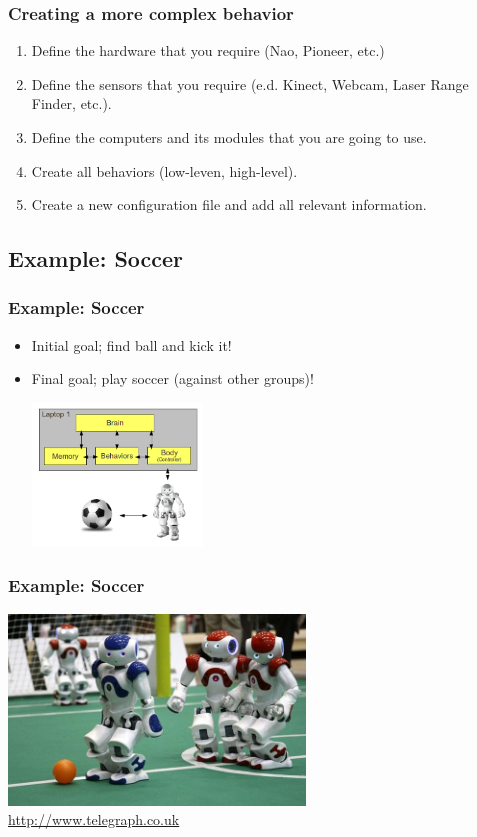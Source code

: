 \documentclass[]{beamer}
\begin{document}
\begin{frame}
    \frametitle{Creating a more complex behavior}
    \begin{enumerate}
        \item Define the hardware that you require (Nao, Pioneer, etc.)
        \item Define the sensors that you require (e.d. Kinect, Webcam, Laser Range Finder, etc.).
        \item Define the computers and its modules that you are going to use.
        \item Create all behaviors (low-leven, high-level).
        \item Create a new configuration file and add all relevant information.
    \end{enumerate}
\end{frame}



\subsection{Example: Soccer}
\begin{frame}
    \frametitle{Example: Soccer}
    \begin{itemize}
        \item Initial goal; find ball and kick it!
        \item Final goal; play soccer (against other groups)!
        \begin{center}
            \includegraphics[height=1.5in]{img/arch_soccer.png}
        \end{center}
    \end{itemize}
\end{frame}

\begin{frame}
    \frametitle{Example: Soccer}
    \begin{center}
        \includegraphics[height=2.0in]{img/soccer.jpg} \\
        \tiny{\url{http://www.telegraph.co.uk}}
    \end{center}
\end{frame}
\end{document}
